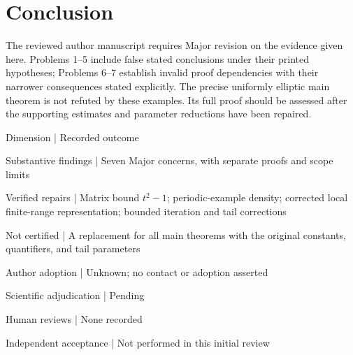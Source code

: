 \documentclass[10pt]{article}
\begin{document}
\section*{Conclusion}
The reviewed author manuscript requires Major revision on the evidence given here. Problems 1–5 include false stated conclusions under their printed hypotheses; Problems 6–7 establish invalid proof dependencies with their narrower consequences stated explicitly. The precise uniformly elliptic main theorem is not refuted by these examples. Its full proof should be assessed after the supporting estimates and parameter reductions have been repaired.\par
Dimension | Recorded outcome\par
Substantive findings | Seven Major concerns, with separate proofs and scope limits\par
Verified repairs | Matrix bound \(t^2-1\); periodic-example density; corrected local finite-range representation; bounded iteration and tail corrections\par
Not certified | A replacement for all main theorems with the original constants, quantifiers, and tail parameters\par
Author adoption | Unknown; no contact or adoption asserted\par
Scientific adjudication | Pending\par
Human reviews | None recorded\par
Independent acceptance | Not performed in this initial review\par
\end{document}
